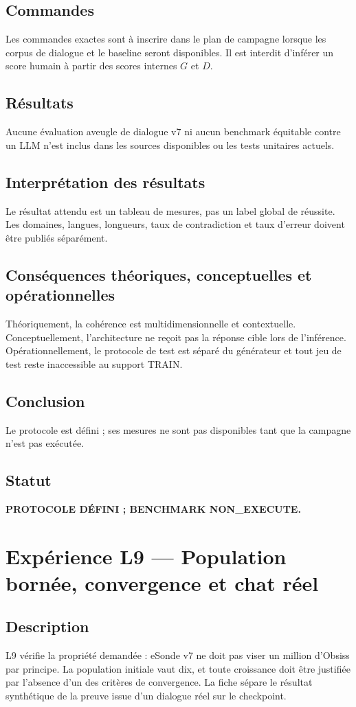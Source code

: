 \documentclass[11pt,a4paper]{report}
\begin{document}
\section{Commandes}
Les commandes exactes sont à inscrire dans le plan de campagne lorsque les corpus de dialogue et le baseline seront disponibles. Il est interdit d'inférer un score humain à partir des scores internes $G$ et $D$.
\section{Résultats}
Aucune évaluation aveugle de dialogue v7 ni aucun benchmark équitable contre un LLM n'est inclus dans les sources disponibles ou les tests unitaires actuels.
\section{Interprétation des résultats}
Le résultat attendu est un tableau de mesures, pas un label global de réussite. Les domaines, langues, longueurs, taux de contradiction et taux d'erreur doivent être publiés séparément.
\section{Conséquences théoriques, conceptuelles et opérationnelles}
Théoriquement, la cohérence est multidimensionnelle et contextuelle. Conceptuellement, l'architecture ne reçoit pas la réponse cible lors de l'inférence. Opérationnellement, le protocole de test est séparé du générateur et tout jeu de test reste inaccessible au support TRAIN.
\section{Conclusion}
Le protocole est défini ; ses mesures ne sont pas disponibles tant que la campagne n'est pas exécutée.
\section{Statut}
\textbf{PROTOCOLE DÉFINI ; BENCHMARK NON\_EXECUTE.}

\chapter{Expérience L9 — Population bornée, convergence et chat réel}
\section{Description}
L9 vérifie la propriété demandée : eSonde v7 ne doit pas viser un million d'Obsiss par principe. La population initiale vaut dix, et toute croissance doit être justifiée par l'absence d'un des critères de convergence. La fiche sépare le résultat synthétique de la preuve issue d'un dialogue réel sur le checkpoint.
\end{document}
